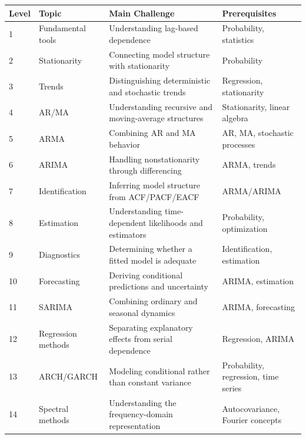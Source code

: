 \documentclass[11pt]{article}
\begin{document}
\begin{longtable}{p{}p{}p{}p{}}
\toprule
\textbf{Level} & \textbf{Topic} & \textbf{Main Challenge} & \textbf{Prerequisites} \\
\midrule
1 & Fundamental tools &
Understanding lag-based dependence &
Probability, statistics \\

2 & Stationarity &
Connecting model structure with stationarity &
Probability \\

3 & Trends &
Distinguishing deterministic and stochastic trends &
Regression, stationarity \\

4 & AR/MA &
Understanding recursive and moving-average structures &
Stationarity, linear algebra \\

5 & ARMA &
Combining AR and MA behavior &
AR, MA, stochastic processes \\

6 & ARIMA &
Handling nonstationarity through differencing &
ARMA, trends \\

7 & Identification &
Inferring model structure from ACF/PACF/EACF &
ARMA/ARIMA \\

8 & Estimation &
Understanding time-dependent likelihoods and estimators &
Probability, optimization \\

9 & Diagnostics &
Determining whether a fitted model is adequate &
Identification, estimation \\

10 & Forecasting &
Deriving conditional predictions and uncertainty &
ARIMA, estimation \\

11 & SARIMA &
Combining ordinary and seasonal dynamics &
ARIMA, forecasting \\

12 & Regression methods &
Separating explanatory effects from serial dependence &
Regression, ARIMA \\

13 & ARCH/GARCH &
Modeling conditional rather than constant variance &
Probability, regression, time series \\

14 & Spectral methods &
Understanding the frequency-domain representation &
Autocovariance, Fourier concepts \\
\bottomrule
\end{longtable}
\end{document}
